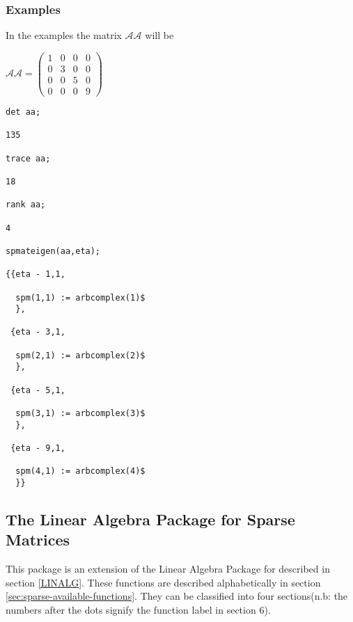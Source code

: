 \subsubsection{Examples}
In the examples the matrix $\mathcal{AA}$ will be

\(
\mathcal{AA} = \left( \begin{array}{cccc} 1 & 0 & 0 & 0 \\ 0 & 3 & 0 & 0 \\
0 & 0 & 5 & 0 \\ 0 & 0 & 0 & 9
\end{array} \right)
\)

\begin {verbatim}
det aa;

135

trace aa;

18

rank aa;

4

spmateigen(aa,eta);

{{eta - 1,1,

  spm(1,1) := arbcomplex(1)$
  },

 {eta - 3,1,

  spm(2,1) := arbcomplex(2)$
  },

 {eta - 5,1,

  spm(3,1) := arbcomplex(3)$
  },

 {eta - 9,1,

  spm(4,1) := arbcomplex(4)$
  }}
\end{verbatim}

\subsection{The Linear Algebra Package for Sparse Matrices}
This package is an extension of the Linear Algebra Package for \REDUCE{}
described in section \ref{LINALG}.
These functions are described
alphabetically in section \ref{sec:sparse-available-functions}.
They can be classified into four sections(n.b: the numbers after
the dots signify the function label in section 6).
